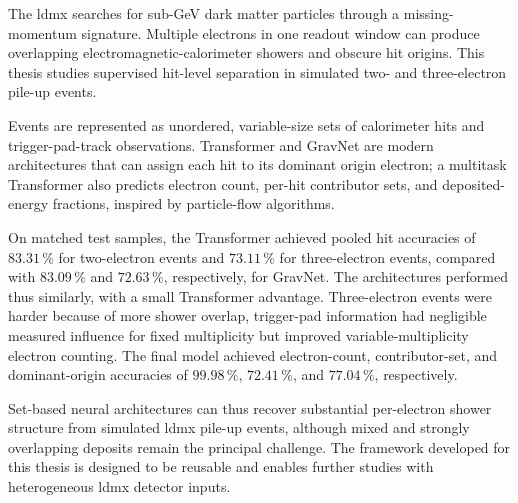 \noindent

The \gls{ldmx} searches for sub-GeV dark matter particles
through a missing-momentum signature. Multiple electrons in one readout
window can produce overlapping electromagnetic-calorimeter showers and
obscure hit origins. This thesis studies supervised hit-level separation in
simulated two- and three-electron pile-up events.

Events are represented as unordered, variable-size sets of calorimeter hits
and trigger-pad-track observations. Transformer and GravNet are modern architectures that can 
assign each hit to its dominant origin electron; a multitask Transformer also
predicts electron count, per-hit contributor sets, and deposited-energy
fractions, inspired by particle-flow algorithms.

On matched test samples, the Transformer achieved pooled hit accuracies of
\(83.31\,\%\) for two-electron events and \(73.11\,\%\) for three-electron
events, compared with \(83.09\,\%\) and \(72.63\,\%\), respectively, for
GravNet. The architectures performed thus similarly, with a small
Transformer advantage. Three-electron events were harder because of more
shower overlap, 
trigger-pad information had negligible measured influence for fixed multiplicity but improved
variable-multiplicity electron counting. The final model achieved
electron-count, contributor-set, and dominant-origin accuracies of
\(99.98\,\%\), \(72.41\,\%\), and \(77.04\,\%\), respectively.

Set-based neural architectures can thus recover substantial per-electron
shower structure from simulated \gls{ldmx} pile-up events, although mixed and
strongly overlapping deposits remain the principal challenge. The framework developed for this thesis is designed to be reusable and enables further studies with heterogeneous \gls{ldmx} detector inputs.































